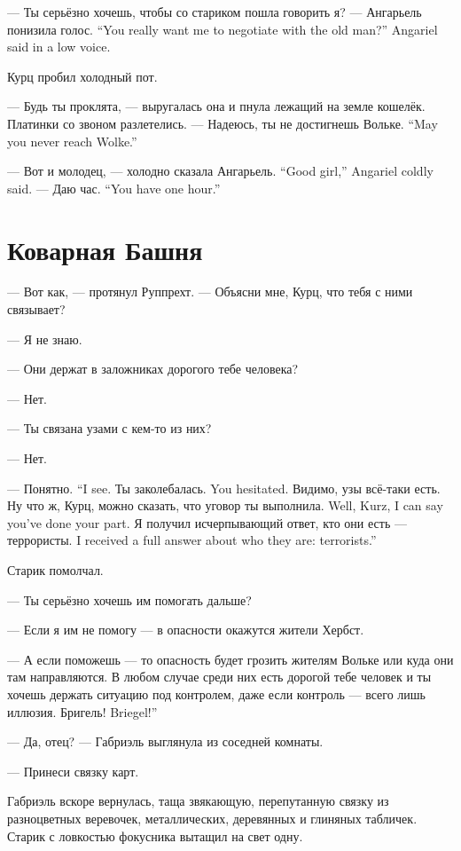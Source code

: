 {--- Ты серьёзно хочешь, чтобы со стариком пошла говорить я? --- Ангарьель понизила голос.}
{``You really want me to negotiate with the old man?'' Angariel said in a low voice.}

Курц пробил холодный пот.

--- Будь ты проклята, --- выругалась она и пнула лежащий на земле кошелёк.
Платинки со звоном разлетелись.
{--- Надеюсь, ты не достигнешь Вольке.}
{``May you never reach Wolke.''}

{--- Вот и молодец, --- холодно сказала Ангарьель.}
{``Good girl,'' Angariel coldly said.}
{--- Даю час.}
{``You have one hour.''}

\section{Коварная Башня}

--- Вот как, --- протянул Руппрехт.
--- Объясни мне, Курц, что тебя с ними связывает?

--- Я не знаю.

--- Они держат в заложниках дорогого тебе человека?

--- Нет.

--- Ты связана узами с кем-то из них?

--- Нет.

{--- Понятно.}
{``I see.}
{Ты заколебалась.}
{You hesitated.}
Видимо, узы всё-таки есть.
{Ну что ж, Курц, можно сказать, что уговор ты выполнила.}
{Well, Kurz, I can say you've done your part.}
{Я получил исчерпывающий ответ, кто они есть --- террористы.}
{I received a full answer about who they are: terrorists.''}

Старик помолчал.

--- Ты серьёзно хочешь им помогать дальше?

--- Если я им не помогу --- в опасности окажутся жители Хербст.

--- А если поможешь --- то опасность будет грозить жителям Вольке или куда они там направляются.
В любом случае среди них есть дорогой тебе человек и ты хочешь держать ситуацию под контролем, даже если контроль --- всего лишь иллюзия.
{Бригель!}
{Briegel!''}

--- Да, отец? --- Габриэль выглянула из соседней комнаты.

--- Принеси связку карт.

Габриэль вскоре вернулась, таща звякающую, перепутанную связку из разноцветных веревочек, металлических, деревянных и глиняных табличек.
Старик с ловкостью фокусника вытащил на свет одну.

